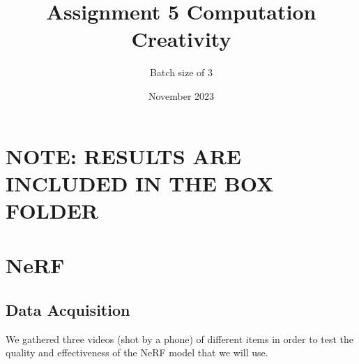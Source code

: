 \documentclass{article}
\title{Assignment 5 Computation Creativity}
\author{Batch size of 3}
\date{November 2023}
\begin{document}
\maketitle




\section{\textbf{NOTE}: RESULTS ARE INCLUDED IN THE BOX FOLDER}

\section{NeRF}

\subsection{Data Acquisition}

We gathered three videos (shot by a phone) of different items in order to test the quality and effectiveness of the NeRF model that we will use.
\end{document}
